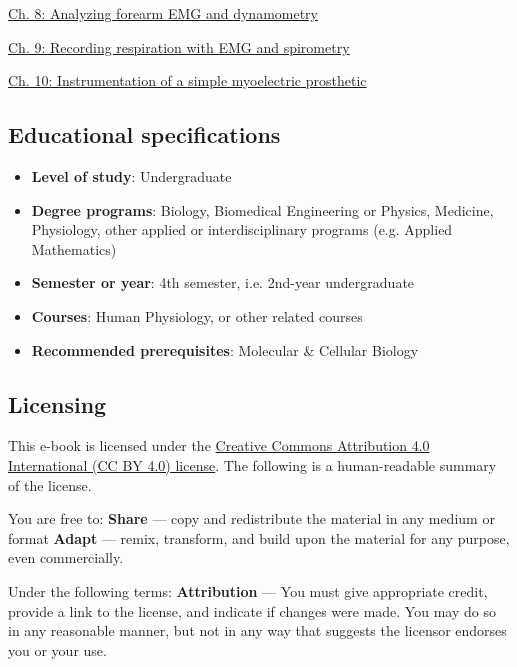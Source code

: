 \documentclass{article}
\begin{document}
\href{https://curvenote.com/oxa:EPpXta8zJdzN048lz8AR/Pl7lyGUpTCUyEhT3xELs}{Ch. 8: Analyzing forearm EMG and dynamometry}

\href{https://curvenote.com/oxa:EPpXta8zJdzN048lz8AR/DIygfLcJx0B6YlWQvuBE}{Ch. 9: Recording respiration with EMG and spirometry}

\href{https://curvenote.com/oxa:EPpXta8zJdzN048lz8AR/Fwnarvyq1j9AlkJ1JWeF}{Ch. 10: Instrumentation of a simple myoelectric prosthetic}

\subsection{Educational specifications}

\begin{itemize}
\item \textbf{Level of study}: Undergraduate
\item \textbf{Degree programs}: Biology, Biomedical Engineering or Physics, Medicine, Physiology, other applied or interdisciplinary programs (e.g. Applied Mathematics)
\item \textbf{Semester or year}: 4th semester, i.e. 2nd-year undergraduate
\item \textbf{Courses}: Human Physiology, or other related courses
\item \textbf{Recommended prerequisites}: Molecular \& Cellular Biology
\end{itemize}

\subsection{Licensing}

This e-book is licensed under the \href{https://creativecommons.org/licenses/by/4.0/deed.en}{Creative Commons Attribution 4.0 International (CC BY 4.0) license}. The following is a human-readable summary of the license.

You are free to:\newline
\textbf{Share} --- copy and redistribute the material in any medium or format\newline
\textbf{Adapt} --- remix, transform, and build upon the material for any purpose, even commercially.

Under the following terms:\newline
\textbf{Attribution} --- You must give appropriate credit, provide a link to the license, and indicate if changes were made. You may do so in any reasonable manner, but not in any way that suggests the licensor endorses you or your use.
\end{document}
